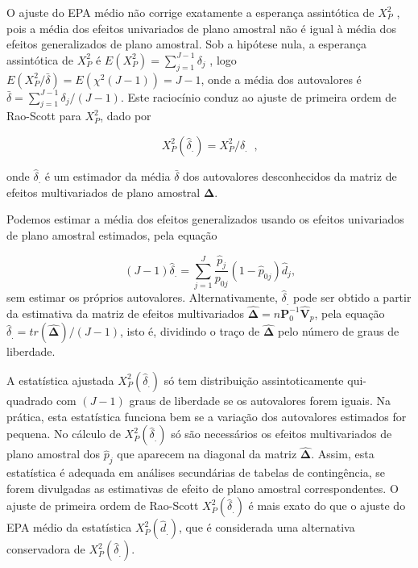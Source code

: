 \documentclass[]{book}
\numberwithin{example}{chapter}
\numberwithin{remark}{chapter}
\numberwithin{definition}{chapter}
\begin{document}
O ajuste do EPA médio não corrige exatamente a esperança assintótica de
\(X_{P}^{2}\) , pois a média dos efeitos univariados de plano amostral
não é igual à média dos efeitos generalizados de plano amostral. Sob a
hipótese nula, a esperança assintótica de \(X_{P}^{2}\) é
\(E\left( X_{P}^{2}\right) =\sum_{j=1}^{J-1}\delta _{j}\) , logo
\(E\left( X_{P}^{2}/\bar{\delta}\right) =E\left( \chi ^{2}\left(J-1\right) \right) =J-1\),
onde a média dos autovalores é
\(\bar{\delta}=\sum_{j=1}^{J-1}\delta _{j}/\left( J-1\right)\). Este
raciocínio conduz ao ajuste de primeira ordem de Rao-Scott para
\(X_{P}^{2}\), dado por

\begin{equation}
X_{P}^{2}\left( \hat{\delta}_{.}\right) =X_{P}^{2}/\hat{\delta}_{.}\;\;\mbox{,}
\label{eq:qual13}
\end{equation}

onde \(\hat{\delta}_{.}\) é um estimador da média \(\bar{\delta}\) dos
autovalores desconhecidos da matriz de efeitos multivariados de plano
amostral \(\mathbf{\Delta }\).

Podemos estimar a média dos efeitos generalizados usando os efeitos
univariados de plano amostral estimados, pela equação

\[
\left( J-1\right) \hat{\delta}_{.}=\sum_{j=1}^J\frac{\hat{p}_{j}}{p_{0j}}\left( 1-\hat{p}_{0j}\right)
 \hat{d}_{j}\mbox{,} 
\] sem estimar os próprios autovalores. Alternativamente,
\(\hat{\delta}_{.}\) pode ser obtido a partir da estimativa da matriz de
efeitos multivariados
\(\mathbf{\hat{\Delta}}=n\mathbf{P}_{0}^{-1}\mathbf{\hat{V}}_{p}\), pela
equação
\(\hat{\delta}_{.}=tr\left( \mathbf{\hat{\Delta}}\right) /\left(J-1\right)\),
isto é, dividindo o traço de \(\mathbf{\hat{\Delta}}\) pelo número de
graus de liberdade.

A estatística ajustada \(X_{P}^{2}\left( \hat{\delta}_{.}\right)\) só
tem distribuição assintoticamente qui-quadrado com \(\left(J-1\right)\)
graus de liberdade se os autovalores forem iguais. Na prática, esta
estatística funciona bem se a variação dos autovalores estimados for
pequena. No cálculo de \(X_{P}^{2}\left( \hat{\delta}_{.}\right)\) só
são necessários os efeitos multivariados de plano amostral dos
\(\hat{p}_{j}\) que aparecem na diagonal da matriz
\(\mathbf{\hat{\Delta}}\). Assim, esta estatística é adequada em
análises secundárias de tabelas de contingência, se forem divulgadas as
estimativas de efeito de plano amostral correspondentes. O ajuste de
primeira ordem de Rao-Scott \(X_{P}^{2}\left( \hat{\delta}_{.}\right)\)
é mais exato do que o ajuste do EPA médio da estatística
\(X_{P}^{2}\left( \hat{d}_{.}\right)\), que é considerada uma
alternativa conservadora de \(X_{P}^{2}\left( \hat{\delta}_{.}\right)\).
\end{document}
